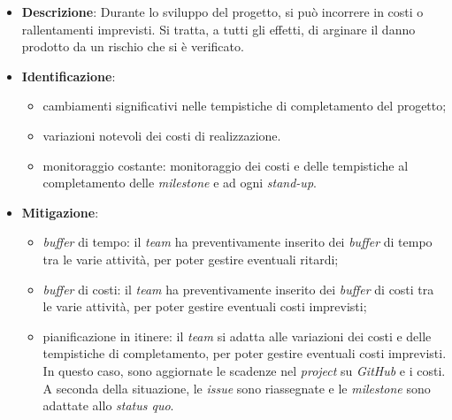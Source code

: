 \label{risk:costi e tempi imprevisti}
\begin{itemize}
	\item \textbf{Descrizione}:
	      Durante lo sviluppo del progetto, si può incorrere in costi o
	      rallentamenti imprevisti. Si tratta, a tutti gli effetti, di arginare
	      il danno prodotto da un rischio che si è verificato.
	\item \textbf{Identificazione}:
	      \begin{itemize}
		      \item cambiamenti significativi nelle tempistiche di completamento
		            del progetto;

		      \item variazioni notevoli dei costi di realizzazione.

		      \item monitoraggio costante: monitoraggio dei costi e delle
		            tempistiche al completamento delle \textit{milestone} e
		            ad ogni \textit{stand-up}.
	      \end{itemize}
	\item \textbf{Mitigazione}:
	      \begin{itemize}
		      \item \textit{buffer} di tempo: il \textit{team} ha
		            preventivamente inserito dei \textit{buffer} di tempo
		            tra le varie attività, per poter gestire eventuali
		            ritardi;

		      \item \textit{buffer} di costi: il \textit{team} ha
		            preventivamente inserito dei \textit{buffer} di costi
		            tra le varie attività, per poter gestire eventuali
		            costi imprevisti;

		      \item pianificazione in itinere: il \textit{team} si adatta
		            alle variazioni dei costi e delle tempistiche di
		            completamento, per poter gestire eventuali costi
		            imprevisti. In questo caso, sono aggiornate le scadenze
		            nel \textit{project} su \textit{GitHub} e i costi.
		            A seconda della situazione, le \textit{issue} sono
		            riassegnate e le \textit{milestone} sono adattate allo
		            \textit{status quo}.
	      \end{itemize}
\end{itemize}

